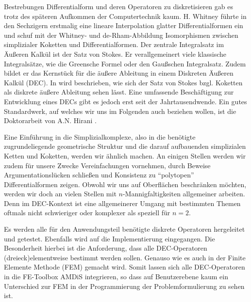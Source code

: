 Bestrebungen Differentialform und deren Operatoren zu diskretisieren gab es trotz des späteren Aufkommen der Computertechnik kaum.
H. Whitney \cite{whitney} führte in den Sechzigern erstmalig eine lineare Interpolation glatter Differentialformen ein 
und schuf mit der Whitney- und de-Rham-Abbildung Isomorphismen zwischen simplizialer Koketten und Differentialformen.
Der zentrale Integralsatz im Äußeren Kalkül ist der Satz von Stokes.
Er verallgemeinert viele klassische Integralsätze, wie die Greensche Formel oder den Gaußschen Integralsatz.
Zudem bildet er das Kernstück für die äußere Ableitung in einem Diskreten Äußeren Kalkül (DEC).
In \cite[7.2C]{Marsden} wird beschrieben, wie sich der Satz von Stokes bzgl. Koketten als diskrete äußere Ableitung sehen lässt.
Eine umfassende Beschäftigung zur Entwicklung eines DECs gibt es jedoch erst seit der Jahrtausendwende.
Ein gutes Standardwerk, auf welches wir uns im Folgenden auch beziehen wollen, ist die Doktorarbeit von A.N. Hirani \cite{hirani}.

Eine Einführung in die Simplizialkomplexe, also in die benötigte zugrundeliegende geometrische Struktur und die darauf aufbauenden
simplizialen Ketten und Koketten, werden wir ähnlich machen.
An einigen Stellen werden wir zudem für unsere Zwecke Vereinfachungen vornehmen, durch Beweise Argumentationslücken schließen und Konsistenz zu "`polytopen"' Differentialformen zeigen.
Obwohl wir uns auf Oberflächen beschränken möchten, werden wir doch an vielen Stellen mit \( n \)-Mannigfaltigkeiten allgemeiner arbeiten.
Denn im DEC-Kontext ist eine allgemeinerer Umgang mit bestimmten Themen oftmals nicht schwieriger oder komplexer als speziell für \( n=2 \). 

Es werden alle für den Anwendungsteil benötigte diskrete Operatoren hergeleitet und getestet.
Ebenfalls wird auf die Implementierung eingegangen.
Die Besonderheit hierbei ist die Anforderung, dass alle DEC-Operatoren (dreieck)elementweise bestimmt werden sollen.
Genauso wie es auch in der Finite Elemente Methode (FEM) gemacht wird. 
Somit lassen sich alle DEC-Operatoren in die FE-Toolbox AMDiS integrieren, so dass auf Benutzerebene kaum ein Unterschied zur FEM in der
Programmierung der Problemformulierung zu sehen ist.

